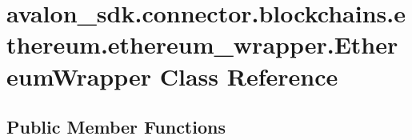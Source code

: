 \hypertarget{classavalon__sdk_1_1connector_1_1blockchains_1_1ethereum_1_1ethereum__wrapper_1_1EthereumWrapper}{}\section{avalon\+\_\+sdk.\+connector.\+blockchains.\+ethereum.\+ethereum\+\_\+wrapper.\+Ethereum\+Wrapper Class Reference}
\label{classavalon__sdk_1_1connector_1_1blockchains_1_1ethereum_1_1ethereum__wrapper_1_1EthereumWrapper}
\subsection*{Public Member Functions}
